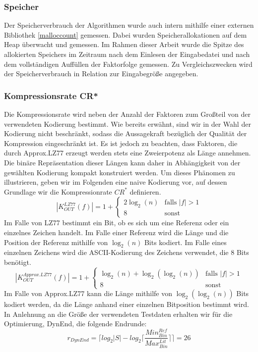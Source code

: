 \subsubsection{Speicher}
Der Speicherverbrauch der Algorithmen wurde auch intern mithilfe einer externen Bibliothek \ref{malloccount} gemessen. Dabei wurden Speicherallokationen auf dem Heap 
überwacht und gemessen. Im Rahmen dieser Arbeit wurde die Spitze des allokierten Speichers im Zeitraum nach dem Einlesen der Eingabedatei und nach dem vollständigen 
Auffüllen der Faktorfolge gemessen. Zu Vergleichszwecken wird der Speicherverbrauch in Relation zur Eingabegröße angegeben.

\subsubsection{Kompressionsrate CR*} \label{cr}
Die Kompressionsrate wird neben der Anzahl der Faktoren zum Großteil von der verwendeten Kodierung bestimmt. Wie bereits erwähnt, sind wir in der Wahl der Kodierung
nicht beschränkt, sodass die Aussagekraft bezüglich der Qualität der Kompression eingeschränkt ist. Es ist jedoch zu beachten, dass Faktoren, die durch Approx.LZ77
erzeugt werden stets eine Zweierpotenz als Länge annehmen. Die binäre Repräsentation dieser Längen kann daher in Abhängigkeit von der gewählten Kodierung kompakt 
konstruiert werden. Um dieses Phänomen zu illustrieren, geben wir im Folgenden eine naive Kodierung vor, auf dessen Grundlage wir die Kompressionrate $CR^*$ definieren.
\begin{equation}
    |K^{LZ77}_{OUT}(f)| = 1 + \begin{cases}
        2\log_2(n) & \text{falls } |f| > 1 \\
        8 & \text{sonst}
    \end{cases}
\end{equation}
Im Falle von LZ77 bestimmt ein Bit, ob es sich um eine Referenz oder ein einzelnes Zeichen handelt. Im Falle einer Referenz wird die Länge und die Position der Referenz
mithilfe von $\log_2(n)$ Bits kodiert. Im Falle eines einzelnen Zeichens wird die ASCII-Kodierung des Zeichens verwendet, die 8 Bits benötigt.
\begin{equation}
    |K^{Approx.LZ77}_{OUT}(f)|= 1 + \begin{cases}
        \log_2(n)+\log_2(\log_2(n)) & \text{falls } |f| > 1 \\
        8 & \text{sonst}
    \end{cases}
\end{equation}
Im Falle von Approx.LZ77 kann die Länge mithilfe von $\log_2(\log_2(n))$ Bits kodiert werden, da die Länge anhand einer einzelnen Bitposition bestimmt wird.
In Anlehnung an die Größe der verwendeten Testdaten erhalten wir für die Optimierung, DynEnd, die folgende Endrunde:
\begin{equation}
    r_{DynEnd} = \lceil log_2{|S|}-log_2{\lceil\frac{Min^{Ref}_{Bin}}{Max^{Lit}_{Bin}}\rceil} \rceil = 26
\end{equation}

